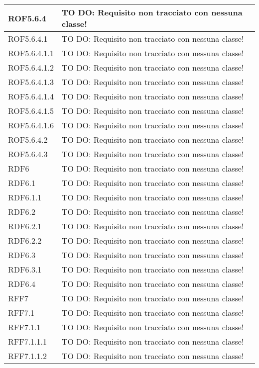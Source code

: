 \begin{center}
\begin{longtable}{| p{4cm} | p{8cm} |}
\hline
ROF5.6.4 & TO DO: Requisito non tracciato con nessuna classe! \\
\hline
ROF5.6.4.1 & TO DO: Requisito non tracciato con nessuna classe! \\
\hline
ROF5.6.4.1.1 & TO DO: Requisito non tracciato con nessuna classe! \\
\hline
ROF5.6.4.1.2 & TO DO: Requisito non tracciato con nessuna classe! \\
\hline
ROF5.6.4.1.3 & TO DO: Requisito non tracciato con nessuna classe! \\
\hline
ROF5.6.4.1.4 & TO DO: Requisito non tracciato con nessuna classe! \\
\hline
ROF5.6.4.1.5 & TO DO: Requisito non tracciato con nessuna classe! \\
\hline
ROF5.6.4.1.6 & TO DO: Requisito non tracciato con nessuna classe! \\
\hline
ROF5.6.4.2 & TO DO: Requisito non tracciato con nessuna classe! \\
\hline
ROF5.6.4.3 & TO DO: Requisito non tracciato con nessuna classe! \\
\hline
RDF6 & TO DO: Requisito non tracciato con nessuna classe! \\
\hline
RDF6.1 & TO DO: Requisito non tracciato con nessuna classe! \\
\hline
RDF6.1.1 & TO DO: Requisito non tracciato con nessuna classe! \\
\hline
RDF6.2 & TO DO: Requisito non tracciato con nessuna classe! \\
\hline
RDF6.2.1 & TO DO: Requisito non tracciato con nessuna classe! \\
\hline
RDF6.2.2 & TO DO: Requisito non tracciato con nessuna classe! \\
\hline
RDF6.3 & TO DO: Requisito non tracciato con nessuna classe! \\
\hline
RDF6.3.1 & TO DO: Requisito non tracciato con nessuna classe! \\
\hline
RDF6.4 & TO DO: Requisito non tracciato con nessuna classe! \\
\hline
RFF7 & TO DO: Requisito non tracciato con nessuna classe! \\
\hline
RFF7.1 & TO DO: Requisito non tracciato con nessuna classe! \\
\hline
RFF7.1.1 & TO DO: Requisito non tracciato con nessuna classe! \\
\hline
RFF7.1.1.1 & TO DO: Requisito non tracciato con nessuna classe! \\
\hline
RFF7.1.1.2 & TO DO: Requisito non tracciato con nessuna classe! \\

\end{longtable}
\end{center}
